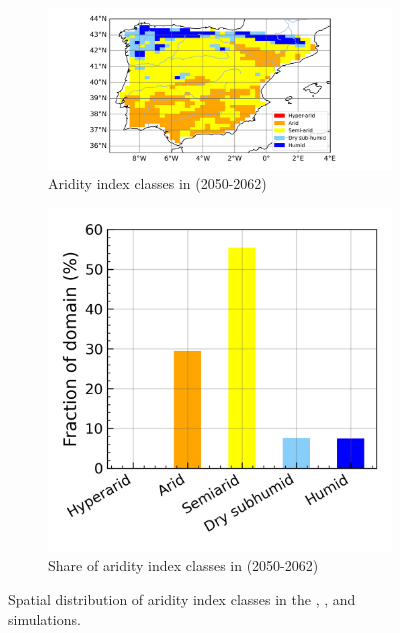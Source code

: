 \begin{figure}[htbp]
    \begin{subfigure}[b]{0.67\textwidth}
        \caption{Aridity index classes in \futirr (2050-2062)}
        \includegraphics[width=\textwidth]{images/chap4/future/aridity_index_fut_irr.png}
    \end{subfigure}
    \begin{subfigure}[b]{0.31\textwidth}
        \caption{Share of aridity index classes in \futirr (2050-2062)}
        \includegraphics[width=\textwidth]{images/chap4/future/aridity_index_distribution_fut_irr.png}
    \end{subfigure}
    \caption{Spatial distribution of aridity index classes in the \presnoirr, \futnoirr, and \futirr simulations.}
    \label{fig:aridity_index_v2}
\end{figure}



